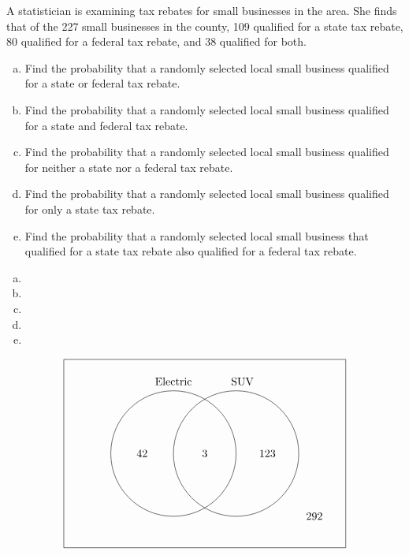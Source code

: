 \documentclass[11pt,letterpaper]{article}
\begin{document}
\newpage



 A statistician is examining tax rebates for small businesses in the area. She finds that of the 227 small businesses in the county, 109 qualified for a state tax rebate, 80 qualified for a federal tax rebate, and 38 qualified for both. 
	\begin{enumerate}[(a)]
	\item Find the probability that a randomly selected local small business qualified for a state or federal tax rebate. 
	\item Find the probability that a randomly selected local small business qualified for a state and federal tax rebate. 
	\item Find the probability that a randomly selected local small business qualified for neither a state nor a federal tax rebate. 
	\item Find the probability that a randomly selected local small business qualified for only a state tax rebate. 
	\item Find the probability that a randomly selected local small business that qualified for a state tax rebate also qualified for a federal tax rebate. 
	\end{enumerate} \pspace

\sol 
\begin{enumerate}[(a)]
\item 
\item 
\item 
\item 
\item 
\end{enumerate}

	\[
	\begin{tikzpicture}
	\draw (0,0) rectangle (9,6);
	\draw (3.5,3) circle (2);
	\draw (5.5,3) circle (2);
	
	\node at (3.5,5.3) {Electric};
	\node at (5.7,5.3) {SUV}; 
	
	\node at (2.5,3) {42};
	\node at (4.5,3) {3};
	\node at (6.5,3) {123};
	\node at (8,1) {292};
	\end{tikzpicture}
	\]



\newpage
\end{document}
